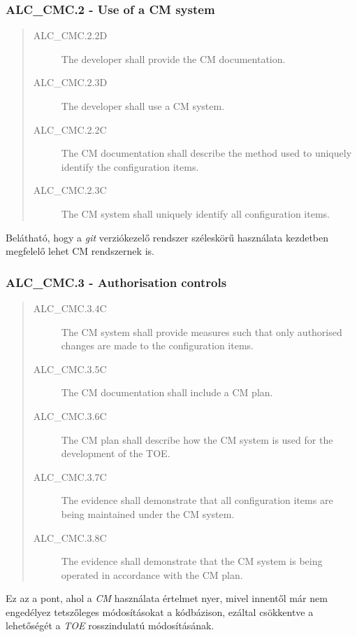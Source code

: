 \pagebreak[3]
\subsubsection{ALC\_CMC.2 - Use of a CM system}

\begin{quote}
    \begin{description}
        \item[ALC\_CMC.2.2D]{The developer shall provide the CM documentation.}
        \item[ALC\_CMC.2.3D]{The developer shall use a CM system.}
        \item[ALC\_CMC.2.2C]{The CM documentation shall describe the method used to uniquely
            identify the configuration items.}
        \item[ALC\_CMC.2.3C]{The CM system shall uniquely identify all configuration items.}
    \end{description}
\end{quote}
Belátható, hogy a \emph{git} verziókezelő rendszer széleskörű használata kezdetben megfelelő
lehet CM rendszernek is.

\pagebreak[1]
\subsubsection{ALC\_CMC.3 - Authorisation controls}
\begin{quote}
    \begin{description}
        \item[ALC\_CMC.3.4C]{The CM system shall provide measures such that only authorised changes
            are made to the configuration items.}
        \item[ALC\_CMC.3.5C]{The CM documentation shall include a CM plan.}
        \item[ALC\_CMC.3.6C]{The CM plan shall describe how the CM system is used for the
            development of the TOE.}
        \item[ALC\_CMC.3.7C]{The evidence shall demonstrate that all configuration items are being
            maintained under the CM system.}
        \item[ALC\_CMC.3.8C]{The evidence shall demonstrate that the CM system is being operated in
            accordance with the CM plan.}
    \end{description}
\end{quote}

Ez az a pont, ahol a \emph{CM} használata értelmet nyer, mivel innentől már nem engedélyez
tetszőleges módosításokat a kódbázison, ezáltal csökkentve a lehetőségét a \emph{TOE} rosszindulatú
módosításának.

